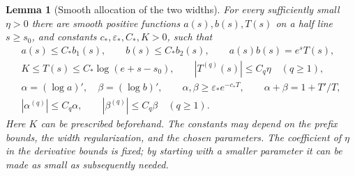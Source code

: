 \documentclass[11pt]{article}
\newtheorem{lemma}[theorem]{Lemma}
\numberwithin{equation}{section}
\begin{document}
\begin{lemma}[Smooth allocation of the two widths]
\label{pair:lem:smooth-allocation}
For every sufficiently small $\eta>0$ there are smooth positive
functions $a(s),b(s),T(s)$ on a half line $s\ge s_0$, and constants
$c_*,\varepsilon_*,C_*,K>0$, such that
\begin{gather}
 a(s)\le C_*b_1(s),\qquad b(s)\le C_*b_2(s),\qquad
 a(s)b(s)=e^sT(s),                                             \label{pair:eq:allocated-product}\\
 K\le T(s)\le C_*\log(e+s-s_0),\qquad
 |T^{(q)}(s)|\le C_q\eta\quad(q\ge1),                         \label{pair:eq:allocated-clock}\\
 \alpha=(\log a)',\quad\beta=(\log b)',\qquad
 \alpha,\beta\ge\varepsilon_*e^{-c_*T},\qquad
 \alpha+\beta=1+T'/T,                                        \label{pair:eq:allocated-slopes}\\
 |\alpha^{(q)}|\le C_q\alpha,
 \qquad |\beta^{(q)}|\le C_q\beta\quad(q\ge1).                 \label{pair:eq:allocated-relative}
\end{gather}
Here $K$ can be prescribed beforehand. The constants may depend on the
prefix bounds, the width regularization, and the chosen parameters.
The coefficient of $\eta$ in the derivative bounds is fixed; by starting
with a smaller parameter it can be made as small as subsequently needed.
\end{lemma}
\end{document}
